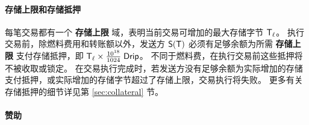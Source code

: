\paragraph{存储上限和存储抵押}

每笔交易都有一个 \textbf{存储上限} 域，表明当前交易可增加的最大存储字节 $\textsf{T}_\ell$。
执行交易前，除燃料费用和转账额以外，发送方 $\mathsf{S}{\left({\textsf{T}} \right)}$ 必须有足够余额为所需 \textbf{存储上限} 支付存储抵押，即 $\textsf{T}_\ell\times\frac{10^{18}}{1024}\;{\sf Drip}$。
不同于燃料费，在执行交易前这些抵押将不被收取或锁定。
在交易执行完成时，若发送方没有足够余额为实际增加的存储支付抵押，或实际增加的存储字节超过了存储上限，交易执行将失败。
更多有关存储抵押的细节详见第 \ref{sec:collateral} 节。

\paragraph{赞助}

